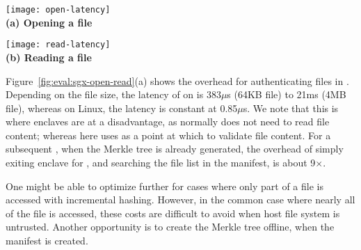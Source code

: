 \begin{figure*}[t!]
\centering
\footnotesize
\begin{minipage}{.49\linewidth}
\centering
\texttt{[image: open-latency]}\\
{\bf (a) Opening a file}
\vspace{6pt}
\end{minipage}
\begin{minipage}{.49\linewidth}
\centering
\texttt{[image: read-latency]}\\
{\bf (b) Reading a file}
\vspace{6pt}
\end{minipage}
\caption{Latency of some expensive system calls in \graphenesgx{}, including opening and reading a secured (authenticated) file, and forking a new process. The results are compared with native Linux and \graphene{}.}
\label{fig:eval:sgx-open-read}
\end{figure*}


Figure~\ref{fig:eval:sgx-open-read}(a)
shows the overhead for authenticating files in .
Depending on the file size, the latency of  on \graphenesgx{} is 383$\mu$s (64KB file) to 21ms (4MB file), whereas on Linux, the latency is constant at 0.85$\mu$s.
We note that this is where enclaves are at a disadvantage, as  
normally does not need to read file content; whereas here \graphenesgx{} uses 
as a point at which to validate file content.
For a subsequent , when the Merkle tree is already generated, the overhead of simply exiting enclave for , and searching the file list in the manifest, is about 9$\times$.


One might be able to optimize further for cases where only part of a file is accessed
with incremental hashing.  However, in the common case where nearly all of the file is accessed,
these costs are difficult to avoid when host file system is untrusted.
Another opportunity 
is to create the Merkle tree offline, when the manifest is created.



